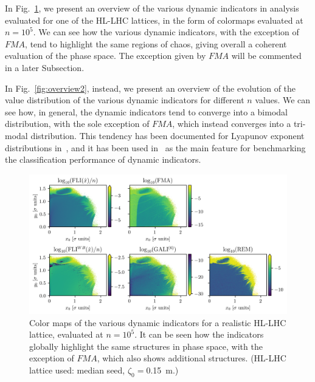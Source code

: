 In Fig.~\ref{fig:overview}, we present an overview of the various dynamic indicators in analysis evaluated for one of the HL-LHC lattices, in the form of colormaps evaluated at $n=10^5$. We can see how the various dynamic indicators, with the exception of $FMA$, tend to highlight the same regions of chaos, giving overall a coherent evaluation of the phase space. The exception given by $FMA$ will be commented in a later Subsection. 

In Fig.~\ref{fig:overview2}, instead, we present an overview of the evolution of the value distribution of the various dynamic indicators for different $n$ values. We can see how, in general, the dynamic indicators tend to converge into a bimodal distribution, with the sole exception of $FMA$, which instead converges into a tri-modal distribution. This tendency has been documented for Lyapunov exponent distributions in~\cite{}, and it has been used in~\cite{} as the main feature for benchmarking the classification performance of dynamic indicators.

\begin{figure}
    \centering
    \includegraphics[width=1.0\textwidth]{6_lhc_dynamic_indicators/figs/overview.png}
    \caption{Color maps of the various dynamic indicators for a realistic HL-LHC lattice, evaluated at $n=10^5$. It can be seen how the indicators globally highlight the same structures in phase space, with the exception of $FMA$, which also shows additional structures. (HL-LHC lattice used: median seed, $\zeta_0=$\SI{0.15}{\meter}.)}
    \label{fig:overview}
\end{figure}

